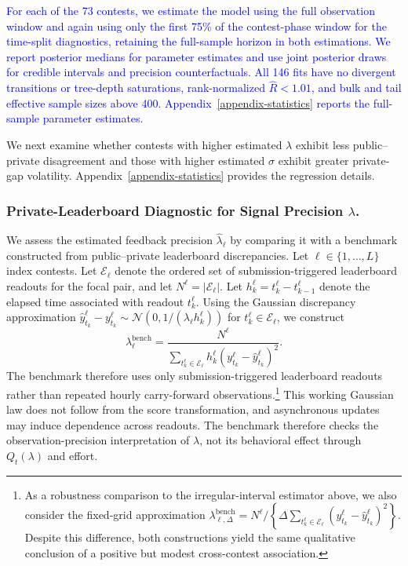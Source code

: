 \documentclass[mnsc]{informs3}
\begin{document}
\textcolor{blue}{For each of the 73 contests, we estimate the model using the full observation window and again using only the first 75\% of the contest-phase window for the time-split diagnostics, retaining the full-sample horizon in both estimations. We report posterior medians for parameter estimates and use joint posterior draws for credible intervals and precision counterfactuals. All 146 fits have no divergent transitions or tree-depth saturations, rank-normalized $\widehat R<1.01$, and bulk and tail effective sample sizes above 400. Appendix~\ref{appendix-statistics} reports the full-sample parameter estimates.}

{We next examine whether contests with higher estimated $\lambda$ exhibit less public--private disagreement and those with higher estimated $\sigma$ exhibit greater private-gap volatility. Appendix~\ref{appendix-statistics} provides the regression details.}

\subsubsection{Private-Leaderboard Diagnostic for Signal Precision $\lambda$.}
{We assess the estimated feedback precision $\hat\lambda_\ell$ by comparing it with a benchmark constructed from public--private leaderboard discrepancies.}
Let $\ell\in\{1,\ldots,L\}$ index contests.
Let $\mathcal E_\ell$ denote the ordered set of submission-triggered leaderboard readouts for the focal pair, and let $N^\ell=|\mathcal E_\ell|$.
Let $h_k^\ell=t_k^\ell-t_{k-1}^\ell$ denote the elapsed time associated with readout $t_k^\ell$.
{Using the Gaussian discrepancy approximation $\hat y_{t_k}^\ell-y_{t_k}^\ell\sim\mathcal N\!\left(0,1/(\lambda_\ell h_k^\ell)\right)$ for $t_k^\ell\in\mathcal E_\ell$, we construct}
\begin{equation*}
\lambda^{\text{bench}}_\ell =
\frac{N^\ell}
{\sum_{t_k^\ell\in\mathcal E_\ell}
h_k^\ell (y_{t_k}^\ell - \hat{y}_{t_k}^\ell)^2}.
\end{equation*}
The benchmark therefore uses only submission-triggered leaderboard readouts rather than repeated hourly carry-forward observations.\footnote{
As a robustness comparison to the irregular-interval estimator above, we also consider the fixed-grid approximation $\lambda_{\ell,\Delta}^{\mathrm{bench}}=N^\ell/\left\{\Delta\sum_{t_k^\ell\in\mathcal E_\ell}(y_{t_k}^\ell-\hat y_{t_k}^\ell)^2\right\}$. 
Despite this difference, both constructions yield the same qualitative conclusion of a positive but modest cross-contest association.
}
{This working Gaussian law does not follow from the score transformation, and asynchronous updates may induce dependence across readouts. The benchmark therefore checks the observation-precision interpretation of $\lambda$, not its behavioral effect through $Q_t(\lambda)$ and effort.}
\end{document}
